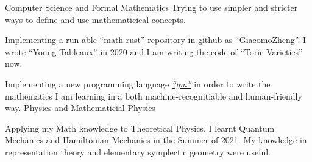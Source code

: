 \resumeSubHeadingListStart
	\resumeSubheading
		{Computer Science and Formal Mathematics}{}
		{Trying to use simpler and stricter ways to define and use mathematicical concepts.}{}
		\resumeItemListStart
			\item Implementing a run-able \href{https://github.com/GiacomoZheng/math-rust}{``math-rust''} repository in github as ``GiacomoZheng''. I wrote ``Young Tableaux'' in 2020 and I am writing the code of ``Toric Varieties'' now.
			\item Implementing a new programming language \href{https://github.com/GiacomoZheng/gm}{\textit{``gm''}} in order to write the mathematics I am learning in a both machine-recognitiable and human-friendly way.
		\resumeItemListEnd
	\resumeSubheadingPlain
		{Physics and Mathematicial Physics}{}
		\resumeItemListStart
			\item Applying my Math knowledge to Theoretical Physics. I learnt Quantum Mechanics and Hamiltonian Mechanics in the Summer of 2021. My knowledge in representation theory and elementary symplectic geometry were useful.
		\resumeItemListEnd
\resumeSubHeadingListEnd

